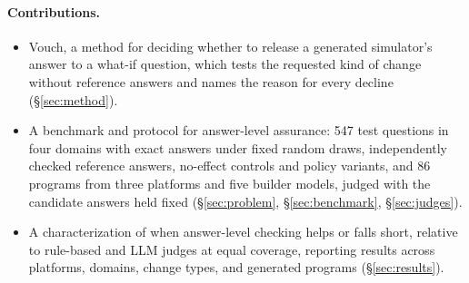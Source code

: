 \paragraph{Contributions.}
\begin{itemize}[leftmargin=*,nosep]
  \item Vouch, a method for deciding whether to release a generated simulator's answer to a what-if question, which tests the requested kind of change without reference answers and names the reason for every decline (\S\ref{sec:method}).
  \item A benchmark and protocol for answer-level assurance: 547 test questions in four domains with exact answers under fixed random draws, independently checked reference answers, no-effect controls and policy variants, and 86 programs from three platforms and five builder models, judged with the candidate answers held fixed (\S\ref{sec:problem}, \S\ref{sec:benchmark}, \S\ref{sec:judges}).
  \item A characterization of when answer-level checking helps or falls short, relative to rule-based and LLM judges at equal coverage, reporting results across platforms, domains, change types, and generated programs (\S\ref{sec:results}).
\end{itemize}
